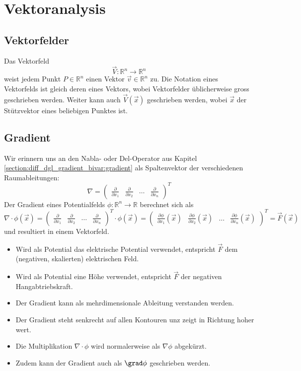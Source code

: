 \section{Vektoranalysis}

\subsection{Vektorfelder}
Das Vektorfeld \[\vec{V}:\mathbb{R}^n \rightarrow \mathbb{R}^n\] weist jedem Punkt $P \in \mathbb{R}^n$ einen Vektor $\vec{v} \in \mathbb{R}^n$ zu.
Die Notation eines Vektorfelds ist gleich deren eines Vektors, wobei Vektorfelder üblicherweise gross geschrieben werden.
Weiter kann auch $\vec{V}(\vec{x})$ geschrieben werden, wobei $\vec{x}$ der Stützvektor eines beliebigen Punktes ist.

\subsection{Gradient}
Wir erinnern uns an den Nabla- oder Del-Operator aus Kapitel \ref{section:diff_dgl_gradient_bivar:gradient} als Spaltenvektor der verschiedenen Raumableitungen:
\[
    \nabla 
    = \begin{pmatrix} \frac{\partial}{\partial x_1} & \frac{\partial}{\partial x_2} & \dots & \frac{\partial}{\partial x_n} \end{pmatrix}^T
\]
Der Gradient eines Potentialfelds $\phi: \mathbb{R}^n \to \mathbb{R}$ berechnet sich als 
\[
    \nabla \cdot \phi(\vec{x}) 
    = \begin{pmatrix} \frac{\partial}{\partial x_1} & \frac{\partial}{\partial x_2} & \dots & \frac{\partial}{\partial x_n} \end{pmatrix}^T \cdot \phi(\vec{x}) 
    = \begin{pmatrix} \frac{\partial \phi}{\partial x_1}(\vec{x}) & \frac{\partial \phi}{\partial x_2}(\vec{x}) & \dots & \frac{\partial \phi}{\partial x_n}(\vec{x}) \end{pmatrix}^T 
    = \vec{F}(\vec{x})
\]
und resultiert in einem Vektorfeld.
\begin{itemize}
    \item Wird als Potential das elektrische Potential verwendet, entspricht $\vec{F}$ dem (negativen, skalierten) elektrischen Feld.
    \item Wird als Potential eine Höhe verwendet, entspricht $\vec{F}$ der negativen Hangabtriebskraft.
    \item Der Gradient kann als mehrdimensionale Ableitung verstanden werden.
    \item Der Gradient steht senkrecht auf allen Kontouren unz zeigt in Richtung hoher wert.
    \item Die Multiplikation $\nabla \cdot \phi$ wird normalerweise als $\nabla \phi$ abgekürzt.
    \item Zudem kann der Gradient auch als $\grad \phi$ geschrieben werden.
\end{itemize}

